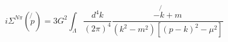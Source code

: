 \begin{equation}
i\Sigma ^{N\pi }(\not{p})=3G^{2}\int_{\Lambda }\frac{d^{4}k}{(2\pi )^{4}}%
\frac{-\not{k}+m}{(k^{2}-m^{2})[(p-k)^{2}-\mu ^{2}]}
\end{equation}

